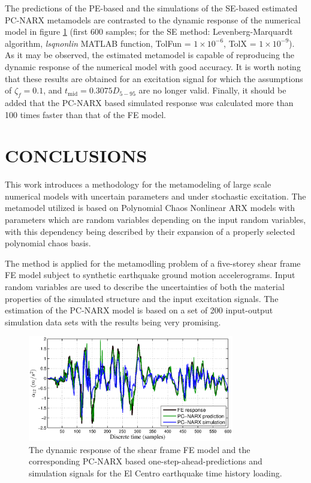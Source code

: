 \documentclass[12pt,a4paper,twocolumn,fleqn]{narms}
\begin{document}
The predictions of the PE-based and the simulations of the SE-based estimated PC-NARX metamodels are contrasted to the dynamic response of the numerical model in figure \ref{fig:preds} (first 600 samples; for the SE method: Levenberg-Marquardt algorithm, {\em lsqnonlin} MATLAB function, TolFun = $1\times 10^{-6}$, TolX = $1\times 10^{-9}$). As it may be observed, the estimated metamodel is capable of reproducing the dynamic response of the numerical model with good accuracy. It is worth noting that these results are obtained for an excitation signal for which the assumptions of $\zeta_f = 0.1$, and $t_{\text{mid}} = 0.3075 D_{5-95}$ are no longer valid. Finally, it should be added that the PC-NARX based simulated response was calculated more than 100 times faster than that of the FE model.  

\section{CONCLUSIONS}
This work introduces a methodology for the metamodeling of large scale numerical models with uncertain parameters and under stochastic excitation. The metamodel utilized is based on Polynomial Chaos Nonlinear ARX models with parameters which are random variables depending on the input random variables, with this dependency being described by their expansion of a properly selected polynomial chaos basis.
 
The method is applied for the metamodling problem of a five-storey shear frame FE model subject to synthetic earthquake ground motion accelerograms. Input random variables are used to describe the uncertainties of both the material properties of the simulated structure and the input excitation signals. The estimation of the PC-NARX model is based on a set of 200 input-output simulation data sets with the results being very promising. 

\begin{figure}[t!]
\centering\includegraphics[width=9cm]{figs/preds_sims.eps}
\caption{The dynamic response of the shear frame FE model and the corresponding PC-NARX based one-step-ahead-predictions and simulation signals for the El Centro earthquake time history loading.}\label{fig:preds}
\end{figure}




\end{document}
